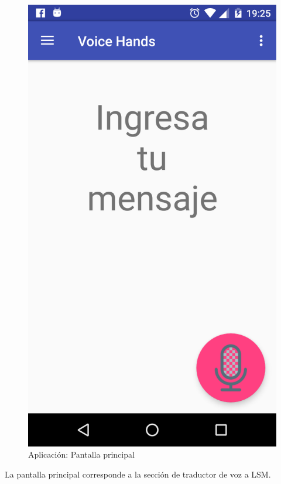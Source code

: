 \begin{figure}[H]
	\centering
	\includegraphics[scale = 0.2]{figures/app03}
	\caption{Aplicación: Pantalla principal}
	\label{fig:app02}
\end{figure}

La pantalla principal corresponde a la sección de traductor de voz a LSM.

